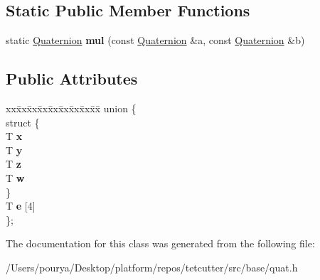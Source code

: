 \subsection*{Static Public Member Functions}
\begin{DoxyCompactItemize}
\item 
\hypertarget{classps_1_1base_1_1Quaternion_a5e80f16632142549c22efb4d5777bcdb}{}static \hyperlink{classps_1_1base_1_1Quaternion}{Quaternion} {\bfseries mul} (const \hyperlink{classps_1_1base_1_1Quaternion}{Quaternion} \&a, const \hyperlink{classps_1_1base_1_1Quaternion}{Quaternion} \&b)\label{classps_1_1base_1_1Quaternion_a5e80f16632142549c22efb4d5777bcdb}

\end{DoxyCompactItemize}
\subsection*{Public Attributes}
\begin{DoxyCompactItemize}
\item 
\hypertarget{classps_1_1base_1_1Quaternion_a473bc537459bf923f9bab416f4ab4aa1}{}\begin{tabbing}
xx\=xx\=xx\=xx\=xx\=xx\=xx\=xx\=xx\=\kill
union \{\\
\hypertarget{unionps_1_1base_1_1Quaternion_1_1_0D0_aa63cea41f223940ae38cdb9545c653fd}{}\>struct \{\\
\>\>T {\bfseries x}\\
\>\>T {\bfseries y}\\
\>\>T {\bfseries z}\\
\>\>T {\bfseries w}\\
\>\} \label{unionps_1_1base_1_1Quaternion_1_1_0D0_aa63cea41f223940ae38cdb9545c653fd}
\\
\>T {\bfseries e} \mbox{[}4\mbox{]}\\
\}; \label{classps_1_1base_1_1Quaternion_a473bc537459bf923f9bab416f4ab4aa1}
\\

\end{tabbing}\end{DoxyCompactItemize}


The documentation for this class was generated from the following file\+:\begin{DoxyCompactItemize}
\item 
/\+Users/pourya/\+Desktop/platform/repos/tetcutter/src/base/quat.\+h\end{DoxyCompactItemize}
